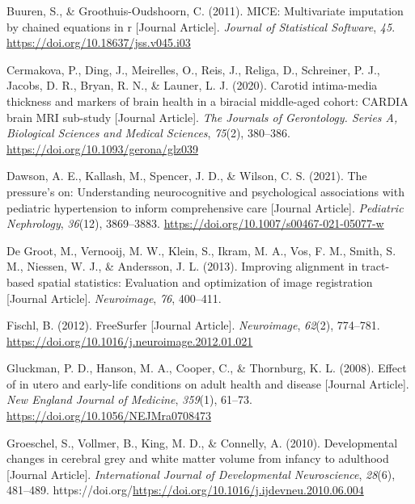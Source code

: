 \documentclass[
  letterpaper,
  DIV=11,
  numbers=noendperiod]{scrreport}
\newlength{\cslhangindent}
\newenvironment{CSLReferences}[2] %
 {\begin{list}{}{%
  \setlength{\itemindent}{0pt}
  \setlength{\leftmargin}{0pt}
  \setlength{\parsep}{0pt}
  \ifodd #1
   \setlength{\leftmargin}{\cslhangindent}
   \setlength{\itemindent}{-1\cslhangindent}
  \fi
  \setlength{\itemsep}{#2\baselineskip}}}
 {\end{list}}
\begin{document}
\begin{CSLReferences}{1}{0}
Buuren, S., \& Groothuis-Oudshoorn, C. (2011). MICE: Multivariate
imputation by chained equations in r {[}Journal Article{]}.
\emph{Journal of Statistical Software}, \emph{45}.
\url{https://doi.org/10.18637/jss.v045.i03}

Cermakova, P., Ding, J., Meirelles, O., Reis, J., Religa, D., Schreiner,
P. J., Jacobs, D. R., Bryan, R. N., \& Launer, L. J. (2020). Carotid
intima-media thickness and markers of brain health in a biracial
middle-aged cohort: CARDIA brain MRI sub-study {[}Journal Article{]}.
\emph{The Journals of Gerontology. Series A, Biological Sciences and
Medical Sciences}, \emph{75}(2), 380--386.
\url{https://doi.org/10.1093/gerona/glz039}

Dawson, A. E., Kallash, M., Spencer, J. D., \& Wilson, C. S. (2021). The
pressure's on: Understanding neurocognitive and psychological
associations with pediatric hypertension to inform comprehensive care
{[}Journal Article{]}. \emph{Pediatric Nephrology}, \emph{36}(12),
3869--3883. \url{https://doi.org/10.1007/s00467-021-05077-w}

De Groot, M., Vernooij, M. W., Klein, S., Ikram, M. A., Vos, F. M.,
Smith, S. M., Niessen, W. J., \& Andersson, J. L. (2013). Improving
alignment in tract-based spatial statistics: Evaluation and optimization
of image registration {[}Journal Article{]}. \emph{Neuroimage},
\emph{76}, 400--411.

Fischl, B. (2012). FreeSurfer {[}Journal Article{]}. \emph{Neuroimage},
\emph{62}(2), 774--781.
\url{https://doi.org/10.1016/j.neuroimage.2012.01.021}

Gluckman, P. D., Hanson, M. A., Cooper, C., \& Thornburg, K. L. (2008).
Effect of in utero and early-life conditions on adult health and disease
{[}Journal Article{]}. \emph{New England Journal of Medicine},
\emph{359}(1), 61--73. \url{https://doi.org/10.1056/NEJMra0708473}

Groeschel, S., Vollmer, B., King, M. D., \& Connelly, A. (2010).
Developmental changes in cerebral grey and white matter volume from
infancy to adulthood {[}Journal Article{]}. \emph{International Journal
of Developmental Neuroscience}, \emph{28}(6), 481--489.
https://doi.org/\url{https://doi.org/10.1016/j.ijdevneu.2010.06.004}


\end{CSLReferences}
\end{document}
